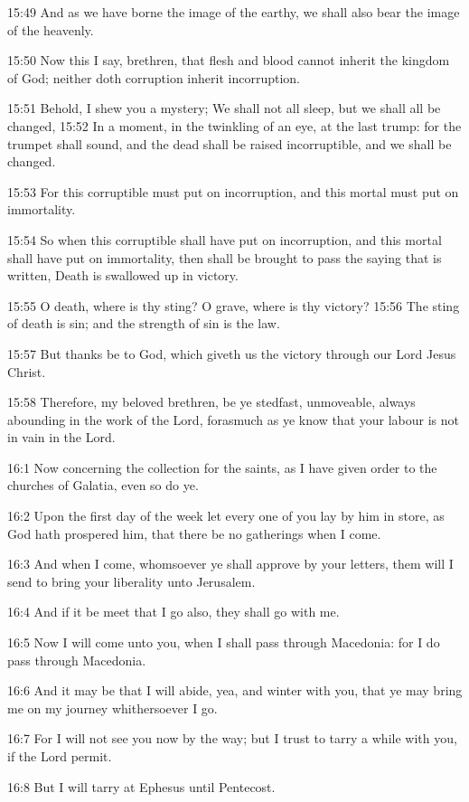 15:49 And as we have borne the image of the earthy, we shall also bear the image of the heavenly.

15:50 Now this I say, brethren, that flesh and blood cannot inherit the kingdom of God; neither doth corruption inherit incorruption.

15:51 Behold, I shew you a mystery; We shall not all sleep, but we shall all be changed, 15:52 In a moment, in the twinkling of an eye, at the last trump: for the trumpet shall sound, and the dead shall be raised incorruptible, and we shall be changed.

15:53 For this corruptible must put on incorruption, and this mortal must put on immortality.

15:54 So when this corruptible shall have put on incorruption, and this mortal shall have put on immortality, then shall be brought to pass the saying that is written, Death is swallowed up in victory.

15:55 O death, where is thy sting? O grave, where is thy victory?  15:56 The sting of death is sin; and the strength of sin is the law.

15:57 But thanks be to God, which giveth us the victory through our Lord Jesus Christ.

15:58 Therefore, my beloved brethren, be ye stedfast, unmoveable, always abounding in the work of the Lord, forasmuch as ye know that your labour is not in vain in the Lord.

16:1 Now concerning the collection for the saints, as I have given order to the churches of Galatia, even so do ye.

16:2 Upon the first day of the week let every one of you lay by him in store, as God hath prospered him, that there be no gatherings when I come.

16:3 And when I come, whomsoever ye shall approve by your letters, them will I send to bring your liberality unto Jerusalem.

16:4 And if it be meet that I go also, they shall go with me.

16:5 Now I will come unto you, when I shall pass through Macedonia: for I do pass through Macedonia.

16:6 And it may be that I will abide, yea, and winter with you, that ye may bring me on my journey whithersoever I go.

16:7 For I will not see you now by the way; but I trust to tarry a while with you, if the Lord permit.

16:8 But I will tarry at Ephesus until Pentecost.

